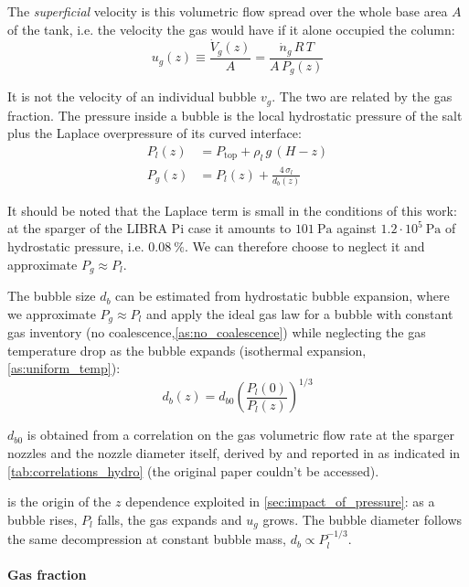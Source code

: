 \documentclass[a4paper,11pt,oneside]{report}
\begin{document}
The \textit{superficial} velocity is this volumetric flow spread over the whole base area $A$ of the tank, i.e. the velocity the gas would have if it alone occupied the column:
\begin{equation}
\label{eq:app_u_g}
    u_g(z) \equiv \frac{\dot V_g(z)}{A} = \frac{\dot n_g\,R\,T}{A\,P_g(z)}
\end{equation}

It is not the velocity of an individual bubble $v_g$. The two are related by the gas fraction. The pressure inside a bubble is the local hydrostatic pressure of the salt plus the Laplace overpressure of its curved interface:
\begin{align}
    P_l(z) &= P_\mathrm{top} + \rho_l\,g\,(H-z) \label{eq:app_P_l}\\
    P_g(z) &= P_l(z) + \frac{4\,\sigma_l}{d_b(z)} \label{eq:app_P_g}
\end{align}

It should be noted that the Laplace term is small in the conditions of this work: at the sparger of the LIBRA Pi case it amounts to $101\ \mathrm{Pa}$ against $1.2\cdot10^5\ \mathrm{Pa}$ of hydrostatic pressure, i.e. $0.08\ \%$. We can therefore choose to neglect it and approximate $P_g\approx P_l$.

The bubble size $d_b$ can be estimated from hydrostatic bubble expansion, where we approximate $P_g\approx P_l$ and apply the ideal gas law for a bubble with constant gas inventory (no coalescence,\cref{as:no_coalescence}) while neglecting the gas temperature drop as the bubble expands (isothermal expansion,\cref{as:uniform_temp}):
\begin{equation}
    d_b(z)=d_{b0}\left(\frac{P_l(0)}{P_l(z)}\right)^{1/3}
\end{equation}

$d_{b0}$ is obtained from a correlation on the gas volumetric flow rate at the sparger nozzles and the nozzle diameter itself, derived by \textcite{kanai_establishment_2017} and reported in \textcite{evans_physics_2026} as indicated in \cref{tab:correlations_hydro} (the original paper couldn't be accessed).

 is the origin of the $z$ dependence exploited in \cref{sec:impact_of_pressure}: as a bubble rises, $P_l$ falls, the gas expands and $u_g$ grows. The bubble diameter follows the same decompression at constant bubble mass, $d_b \propto P_l^{-1/3}$.



\paragraph{Gas fraction}
\end{document}
